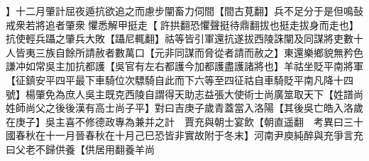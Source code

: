 】十二月肇計屈夜遁抗欲追之而慮步闡畜力伺間【間古莧翻】兵不足分于是但鳴鼔戒衆若將追者肇衆懼悉解甲挺走【許拱翻恐懼聲挺待鼎翻拔也挺走拔身而走也】抗使輕兵躡之肇兵大敗【躡尼輒翻】祜等皆引軍還抗遂拔西陵誅闡及同謀將吏數十人皆夷三族自餘所請赦者數萬口【元非同謀而脅從者請而赦之】東還樂鄉貌無矜色謙冲如常吳主加抗都護【吳官有左右都護今加都護盡護諸將也】羊祜坐貶平南將軍【征鎮安平四平最下車騎位次驃騎自此而下六等至四征祜自車騎貶平南凡降十四號】楊肇免為庶人吳主既克西陵自謂得天助志益張大使術士尚廣筮取天下【姓譜尚姓師尚父之後後漢有高士尚子平】對曰吉庚子歲青蓋當入洛陽【其後吳亡皓入洛歲在庚子】吳主喜不修德政專為兼并之計　賈充與朝士宴飲【朝直遥翻　考異曰三十國春秋在十一月晉春秋在十月己巳恐皆非實故附于冬末】河南尹庾純醉與充爭言充曰父老不歸供養【供居用翻養羊尚
